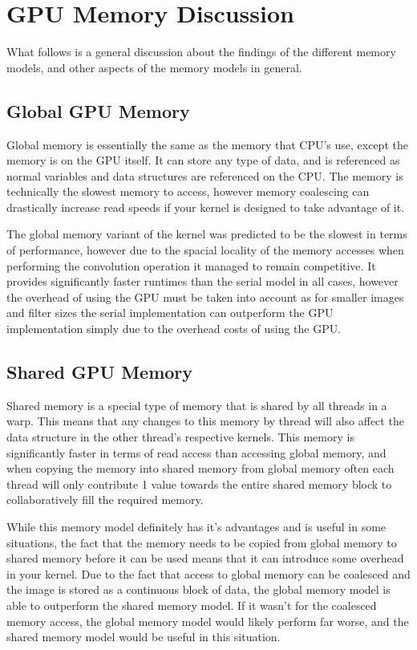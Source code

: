 \documentclass[a4paper,twoside,11pt]{report}
\begin{document}
\chapter*{GPU Memory Discussion}
\setcounter{chapter}{4}
\setcounter{section}{0}
What follows is a general discussion about the findings of the different memory models, and other aspects of the memory models in general. 

\section{Global GPU Memory}
Global memory is essentially the same as the memory that CPU's use, except the memory is on the GPU itself. It can store any type of data, and is referenced as normal variables and data structures are referenced on the CPU. The memory is technically the slowest memory to access, however memory coalescing can drastically increase read speeds if your kernel is designed to take advantage of it.

The global memory variant of the kernel was predicted to be the slowest in terms of performance, however due to the spacial locality of the memory accesses when performing the convolution operation it managed to remain competitive. It provides significantly faster runtimes than the serial model in all cases, however the overhead of using the GPU must be taken into account as for smaller images and filter sizes the serial implementation can outperform the GPU implementation simply due to the overhead costs of using the GPU.

\section{Shared GPU Memory}
Shared memory is a special type of memory that is shared by all threads in a warp. This means that any changes to this memory by thread will also affect the data structure in the other thread's respective kernels. This memory is significantly faster in terms of read access than accessing global memory, and when copying the memory into shared memory from global memory often each thread will only contribute 1 value towards the entire shared memory block to collaboratively fill the required memory.

While this memory model definitely has it's advantages and is useful in some situations, the fact that the memory needs to be copied from global memory to shared memory before it can be used means that it can introduce some overhead in your kernel. Due to the fact that access to global memory can be coalesced and the image is stored as a continuous block of data, the global memory model is able to outperform the shared memory model. If it wasn't for the coalesced memory access, the global memory model would likely perform far worse, and the shared memory model would be useful in this situation.
\end{document}
